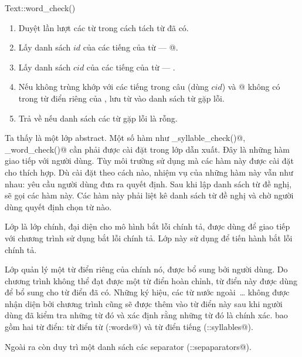 \documentclass[a4paper,oneside,14pt]{extbook} %
\begin{document}
\begin{algo}
\caption{Text::word\_check()}
\label{algo:Text::word_check}
\begin{enumerate}
\item Duyệt lần lượt các từ trong cách tách từ đã có.
\item Lấy danh sách $id$ của các tiếng của từ --- @.
\item Lấy danh sách $cid$ của các tiếng của từ --- \verb@sylls@.
\item Nếu \verb@sylls@ không trùng khớp với các tiếng trong câu (dùng 
  $cid$) và @ không có trong từ điển riêng của
  \verb@VSpell@, lưu từ vào danh sách từ gặp lỗi.
\item Trả về \verb@true@ nếu danh sách các từ gặp lỗi là rỗng.
\end{enumerate}
\end{algo}

Ta thấy \verb@Text@ là một lớp abstract. Một số hàm như
\verb@ui_syllable_check()@, \verb@ui_word_check()@ cần phải được cài
đặt trong lớp dẫn xuất. Đây là những hàm giao tiếp với người dùng. Tùy
môi trường sử dụng mà các hàm này được cài đặt cho thích hợp. Dù cài
đặt theo cách nào, nhiệm vụ của những hàm này vẫn như nhau: yêu cầu
người dùng đưa ra quyết định. Sau khi lập danh sách từ đề nghị,
\verb@Text@ sẽ gọi các hàm này. Các hàm này phải liệt kê danh sách từ
đề nghị và chờ người dùng quyết định chọn từ nào.


Lớp \verb@VSpell@ là lớp chính, đại diện cho mô hình bắt lỗi chính tả,
được dùng để giao tiếp với chương trình sử dụng bắt lỗi chính tả. Lớp
này sử dụng \verb@Text@ để tiến hành bắt lỗi chính tả.

Lớp \verb@VSpell@ quản lý một từ điển riêng của chính nó, được bổ sung bởi
người dùng. Do chương trình không thể đạt được một từ điển hoàn chỉnh,
từ điển này được dùng để bổ sung cho từ điển đã có. Những ký hiệu, các
từ nước ngoài~\ldots{} không được nhận diện bởi chương trình cũng sẽ
được thêm vào từ điển này sau khi người dùng đã kiểm tra những từ đó
và xác định rằng những từ đó là chính xác. \verb@VSpell@ bao gồm hai
từ điển: từ điển từ (\verb@VSpell:words@) và từ điển tiếng
(\verb@VSpell::syllables@).

Ngoài ra \verb@VSpell@ còn duy trì một danh sách các separator
(\verb@VSpell::sepaparators@). 
\end{document}
